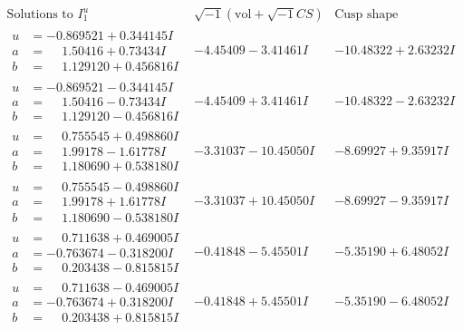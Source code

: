 \documentclass[1p]{elsarticle_modified}
\theoremstyle{definition}
\newcommand{\I}{\sqrt{-1}}
\begin{document}
$$\begin{array}{c|c|c}  
\text{Solutions to }I^u_{1}& \I (\text{vol} + \sqrt{-1}CS) & \text{Cusp shape}\\
 \hline 
\begin{aligned}
u &= -0.869521 + 0.344145 I \\
a &= \phantom{-}1.50416 + 0.73434 I \\
b &= \phantom{-}1.129120 + 0.456816 I\end{aligned}
 & -4.45409 - 3.41461 I & -10.48322 + 2.63232 I \\ \hline\begin{aligned}
u &= -0.869521 - 0.344145 I \\
a &= \phantom{-}1.50416 - 0.73434 I \\
b &= \phantom{-}1.129120 - 0.456816 I\end{aligned}
 & -4.45409 + 3.41461 I & -10.48322 - 2.63232 I \\ \hline\begin{aligned}
u &= \phantom{-}0.755545 + 0.498860 I \\
a &= \phantom{-}1.99178 - 1.61778 I \\
b &= \phantom{-}1.180690 + 0.538180 I\end{aligned}
 & -3.31037 - 10.45050 I & -8.69927 + 9.35917 I \\ \hline\begin{aligned}
u &= \phantom{-}0.755545 - 0.498860 I \\
a &= \phantom{-}1.99178 + 1.61778 I \\
b &= \phantom{-}1.180690 - 0.538180 I\end{aligned}
 & -3.31037 + 10.45050 I & -8.69927 - 9.35917 I \\ \hline\begin{aligned}
u &= \phantom{-}0.711638 + 0.469005 I \\
a &= -0.763674 - 0.318200 I \\
b &= \phantom{-}0.203438 - 0.815815 I\end{aligned}
 & -0.41848 - 5.45501 I & -5.35190 + 6.48052 I \\ \hline\begin{aligned}
u &= \phantom{-}0.711638 - 0.469005 I \\
a &= -0.763674 + 0.318200 I \\
b &= \phantom{-}0.203438 + 0.815815 I\end{aligned}
 & -0.41848 + 5.45501 I & -5.35190 - 6.48052 I \\ \hline\begin{aligned}

\end{aligned}
\end{array}$$
\end{document}
